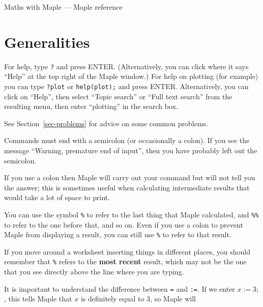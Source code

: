 \documentclass{amsart}
\begin{document}
\begin{center}
 {\Large Maths with Maple --- Maple reference}
\end{center}
\vspace{4ex}

\section{Generalities}

\begin{secenum}
 \item\label{help} For help, type \verb~?~ and press
 ENTER.  (Alternatively, you can click where it says
 ``Help'' at the top right of the Maple window.)  For help
 on plotting (for example) you can type \verb~?plot~ or
 \verb~help(plot);~ and press ENTER.  Alternatively, you can
 click on ``Help'', then select ``Topic search'' or ``Full
 text search'' from the resulting menu, then enter
 ``plotting'' in the search box. 
%
 \item\label{problems} See Section~\ref{sec-problems}
 for advice on some common problems. 
%
 \item\label{semi} Commands must end with a semicolon
 (or occasionally a colon).  If you see the message
 ``Warning, premature end of input'', then you have probably
 left out the semicolon. 
%
 \item\label{colon}
 If you use a colon then Maple will carry out your command
 but will not tell you the answer; this is sometimes useful
 when calculating intermediate results that would take a lot
 of space to print.  
%
 \item\label{percent} You can use the symbol \verb~%~
 to refer to the last thing that Maple calculated, and
 \verb~%%~ to refer to the one before that, and so on. 
 Even if you use a colon to prevent Maple from displaying a
 result, you can still use \verb~%~ to refer to that result. 
%
 \item\label{lasteval}
 If you move around a worksheet inserting things in
 different places, you should remember that \verb~%~ refers
 to the \textbf{most recent} result, which may not be the
 one that you see directly above the line where you are
 typing.  
%
 \item\label{colonequals}
 It is important to understand the difference between
 \verb~=~ and \verb~:=~.  If we enter $x:=3;$, this tells
 Maple that $x$ is definitely equal to $3$, so Maple will

\end{secenum}
\end{document}
